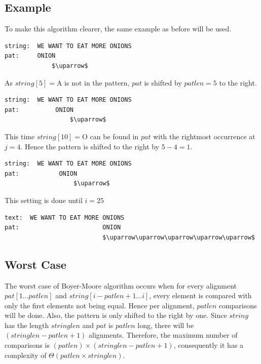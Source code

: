 \subsection{Example}
To make this algorithm clearer, the same example as before will be used.
\begin{lstlisting}[mathescape=true, basicstyle=\LSTfont]
string:  WE WANT TO EAT MORE ONIONS
pat:     ONION
             $\uparrow$
\end{lstlisting}

As $string[5]=$A is not in the pattern, $pat$ is shifted by $patlen=5$ to the right.

\begin{lstlisting}[mathescape=true, basicstyle=\LSTfont]
string:  WE WANT TO EAT MORE ONIONS
pat:          ONION
                  $\uparrow$
\end{lstlisting}

This time $string[10]=$O can be found in $pat$ with the rightmost occurrence at $j=4$. Hence the pattern is shifted to the right by $5-4=1$.

\begin{lstlisting}[mathescape=true, basicstyle=\LSTfont]
string:  WE WANT TO EAT MORE ONIONS
pat:           ONION
                   $\uparrow$
\end{lstlisting}

This setting is done until $i=25$

\begin{lstlisting}[mathescape=true, basicstyle=\LSTfont]
text:  WE WANT TO EAT MORE ONIONS
pat:                       ONION
                           $\uparrow\uparrow\uparrow\uparrow\uparrow$
\end{lstlisting}

\subsection{Worst Case}
The worst case of Boyer-Moore algorithm occurs when for every alignment $pat[1...patlen]$ and $string[i-patlen+1...i]$, every element is compared with only the first elements not being equal. Hence per alignment, $patlen$ comparisons will be done. Also, the pattern is only shifted to the right by one. Since $string$ has the length $stringlen$ and $pat$ is $patlen$ long, there will be $(stringlen-patlen+1)$ alignments. Therefore, the maximum number of comparisons is $(patlen)\times(stringlen-patlen+1)$, consequently it has a complexity of $\Theta(patlen \times stringlen)$.\cite{boyerMoore}


